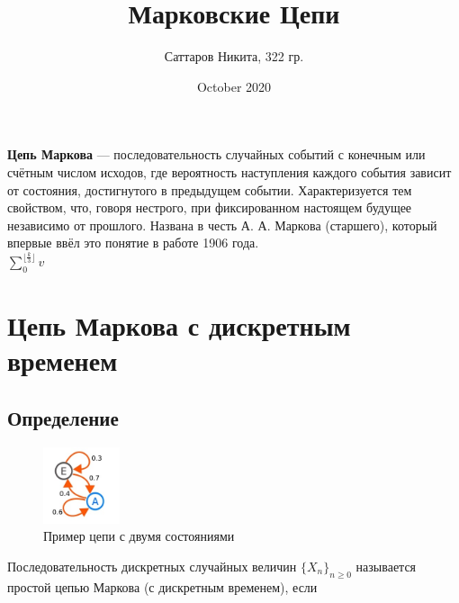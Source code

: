\documentclass{article}
\title{Марковские Цепи}
\author{Саттаров Никита, 322 гр.}
\date{October 2020}
\begin{document}
\maketitle

	\newcommand{\ds}{\displaystyle}

{\bfseries Цепь Маркова}  ---  последовательность случайных событий с конечным или счётным числом исходов, где вероятность наступления каждого события зависит от состояния, достигнутого в предыдущем событии. Характеризуется тем свойством, что, говоря нестрого, при фиксированном настоящем будущее независимо от прошлого. Названа в честь А. А. Маркова (старшего), который впервые ввёл это понятие в работе 1906 года.\\
$\sum\limits_{0}^{\lfloor \frac{k}{3} \rfloor}{v}$
\tableofcontents

\section{Цепь Маркова с дискретным временем}

\subsection{Определение}
\begin{figure}
	\begin{center}
		\includegraphics[width = 0.2\textwidth]{image_1.jpg}
	\end{center}
	\caption{Пример цепи с двумя состояниями}
\end{figure}
Последовательность дискретных случайных величин ${\ds \{X_{n}\}_{n \geq 0} }$ называется простой цепью Маркова (с дискретным временем), если
\end{document}
